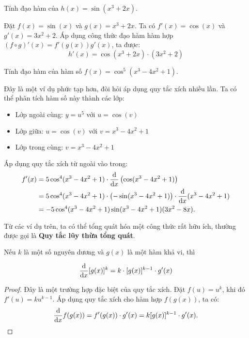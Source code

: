 \begin{example}
Tính đạo hàm của $h(x) = \sin(x^3 + 2x)$.
\end{example}
\begin{solution}
Đặt $f(x) = \sin(x)$ và $g(x) = x^3 + 2x$. Ta có $f'(x) = \cos(x)$ và $g'(x) = 3x^2+2$.
Áp dụng công thức đạo hàm hàm hợp $(f \circ g)'(x) = f'(g(x))g'(x)$, ta được:
$$
h'(x) = \cos(x^3+2x) \cdot (3x^2+2)
$$
\end{solution}

\begin{example}
    Tính đạo hàm của hàm số $f(x) = \cos^5(x^3 - 4x^2 + 1)$.
\end{example}
\begin{solution}
    Đây là một ví dụ phức tạp hơn, đòi hỏi áp dụng quy tắc xích nhiều lần. Ta có thể phân tích hàm số này thành các lớp:
    \begin{itemize}
        \item Lớp ngoài cùng: $y = u^5$ với $u = \cos(v)$
        \item Lớp giữa: $u = \cos(v)$ với $v = x^3 - 4x^2 + 1$
        \item Lớp trong cùng: $v = x^3 - 4x^2 + 1$
    \end{itemize}
    Áp dụng quy tắc xích từ ngoài vào trong:
    \begin{align*}
        f'(x) &= 5\cos^4(x^3 - 4x^2 + 1) \cdot \frac{\mathrm{d}}{\mathrm{d}x}\left( \cos(x^3 - 4x^2 + 1) \right) \\
        &= 5\cos^4(x^3 - 4x^2 + 1) \cdot \left( -\sin(x^3 - 4x^2 + 1) \right) \cdot \frac{\mathrm{d}}{\mathrm{d}x}(x^3 - 4x^2 + 1) \\
        &= -5\cos^4(x^3 - 4x^2 + 1) \sin(x^3 - 4x^2 + 1) (3x^2 - 8x).
    \end{align*}
\end{solution}

Từ các ví dụ trên, ta có thể tổng quát hóa một công thức rất hữu ích, thường được gọi là \textbf{Quy tắc lũy thừa tổng quát}.

\begin{proposition}
Nếu $k$ là một số nguyên dương và $g(x)$ là một hàm khả vi, thì
\begin{tcolorbox}[colback=yellow!10!white, colframe=blue!75!black, boxrule=0.5pt, arc=2mm]
$$
\frac{\mathrm{d}}{\mathrm{d}x} [g(x)]^k = k \cdot [g(x)]^{k-1} \cdot g'(x)
$$
\end{tcolorbox}
\end{proposition}
\begin{proof}
Đây là một trường hợp đặc biệt của quy tắc xích. Đặt $f(u) = u^k$, khi đó $f'(u) = k u^{k-1}$. Áp dụng quy tắc xích cho hàm hợp $f(g(x))$, ta có:
$$
\frac{\mathrm{d}}{\mathrm{d}x} f(g(x)) = f'(g(x)) \cdot g'(x) = k [g(x)]^{k-1} \cdot g'(x).
$$
\end{proof}

